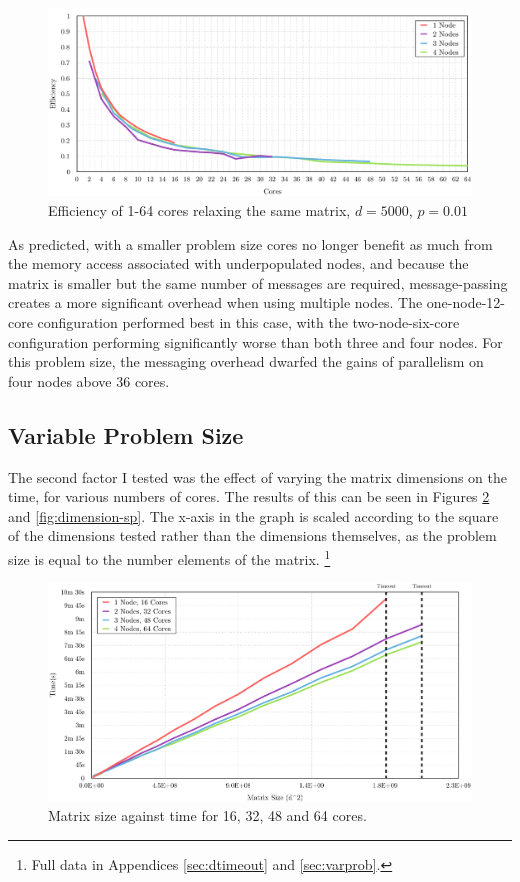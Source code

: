\documentclass[12pt]{article}
\begin{document}
\begin{figure}[htbp!]
        \centering\includegraphics[width=\textwidth]{img/5kefficiency.pdf}
        \caption{Efficiency of 1-64 cores relaxing the same matrix, $d=5000$, $p=0.01$}
        \label{fig:eff5}
\end{figure}

As predicted, with a smaller problem size cores no longer benefit as much from the memory access associated with underpopulated nodes, and because the matrix is smaller but the same number of messages are required, message-passing creates a more significant overhead when using multiple nodes. The one-node-12-core configuration performed best in this case, with the two-node-six-core configuration performing significantly worse than both three and four nodes. For this problem size, the messaging overhead dwarfed the gains of parallelism on four nodes above 36 cores.


\clearpage
\subsection{Variable Problem Size}

The second factor I tested was the effect of varying the matrix dimensions on the time, for various numbers of cores. The results of this can be seen in Figures \ref{fig:dimension-time} and \ref{fig:dimension-sp}. The x-axis in the graph is scaled according to the square of the dimensions tested rather than the dimensions themselves, as the problem size is equal to the number elements of the matrix. \footnote{Full data in Appendices \ref{sec:dtimeout} and \ref{sec:varprob}.}


\begin{figure}[htbp!]
	\centering\includegraphics[width=\textwidth]{img/dimension-time.pdf}
	\caption{Matrix size against time for 16, 32, 48 and 64 cores.}
	\label{fig:dimension-time}
\end{figure}
\end{document}
